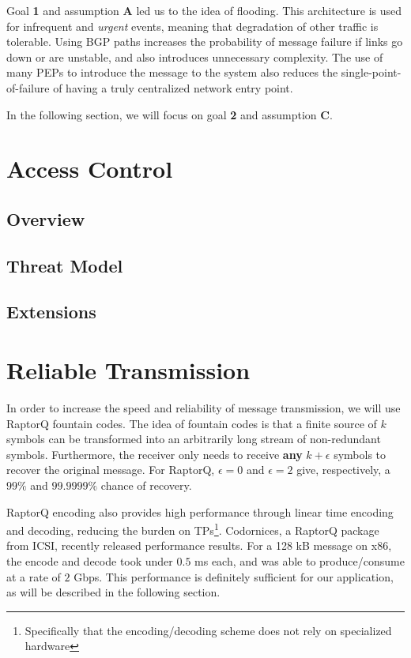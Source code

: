 Goal \textbf{1} and assumption \textbf{A} led us to the idea of flooding. This architecture is used for infrequent and \textit{urgent} events, meaning that degradation of other traffic is tolerable. Using BGP paths increases the probability of message failure if links go down or are unstable, and also introduces unnecessary complexity. The use of many PEPs to introduce the message to the system also reduces the single-point-of-failure of having a truly centralized network entry point.

In the following section, we will focus on goal \textbf{2} and assumption \textbf{C}. 


\section{Access Control}\label{acl}
\subsection{Overview}

\subsection{Threat Model}
\subsection{Extensions}
\section{Reliable Transmission}\label{reliable}
In order to increase the speed and reliability of message transmission, we will use RaptorQ fountain codes. The idea of fountain codes is that a finite source of $k$ symbols can be transformed into an arbitrarily long stream of non-redundant symbols. Furthermore, the receiver only needs to receive \textbf{any} $k + \epsilon$ symbols to recover the original message. For RaptorQ, $\epsilon = 0$ and $\epsilon = 2$ give, respectively, a $99\%$ and $99.9999\%$ chance of recovery\cite{raptorq, raptorqpresent}.

RaptorQ encoding also provides high performance through linear time encoding and decoding, reducing the burden on TPs\footnote{Specifically that the encoding/decoding scheme does not rely on specialized hardware}. Codornices, a RaptorQ package from ICSI, recently released performance results. For a 128 kB message on x86, the encode and decode took under $0.5$ ms each, and was able to produce/consume at a rate of $2$ Gbps\cite{raptorqperf}. This performance is definitely sufficient for our application, as will be described in the following section.
